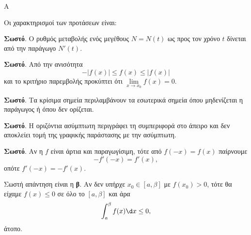 \begin{thema}{Α}
\begin{erwthma}
\item {}

\item {}

\item {}

\item Οι χαρακτηρισμοί των προτάσεων είναι:
\begin{alist}
\item \textbf{Σωστό}. Ο ρυθμός μεταβολής ενός μεγέθους $N=N(t)$ ως προς τον χρόνο $t$ δίνεται από την παράγωγο $N'(t)$.
\item \textbf{Σωστό}. Από την ανισότητα
\[ -|f(x)|\leq f(x)\leq |f(x)| \]
και το κριτήριο παρεμβολής προκύπτει ότι $\lim\limits_{x\to x_0}f(x)=0$.
\item \textbf{Σωστό}. Τα κρίσιμα σημεία περιλαμβάνουν τα εσωτερικά σημεία όπου μηδενίζεται η παράγωγος ή όπου δεν ορίζεται.
\item \textbf{Σωστό}. Η οριζόντια ασύμπτωτη περιγράφει τη συμπεριφορά στο άπειρο και δεν αποκλείει τομή της γραφικής παράστασης με την ασύμπτωτη.
\item \textbf{Σωστό}. Αν η $f$ είναι άρτια και παραγωγίσιμη, τότε από $f(-x)=f(x)$ παίρνουμε
\[ -f'(-x)=f'(x), \]
οπότε $f'(-x)=-f'(x)$.
\end{alist}

\item Σωστή απάντηση είναι η \textbf{β}. Αν δεν υπήρχε $x_0\in[a,\beta]$ με $f(x_0)>0$, τότε θα είχαμε $f(x)\leq0$ σε όλο το $[a,\beta]$ και άρα
\[ \dint_a^\beta f(x)\d x\leq0, \]
άτοπο.
\end{erwthma}
\end{thema}

